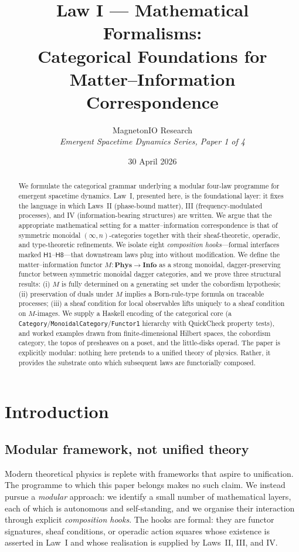 \documentclass[12pt]{article}
\title{Law I --- Mathematical Formalisms:\\
Categorical Foundations for Matter--Information Correspondence}
\author{MagnetonIO Research \\
\textit{Emergent Spacetime Dynamics Series, Paper 1 of 4}}
\date{30 April 2026}
\theoremstyle{definition}
\theoremstyle{remark}
\newcommand{\Phys}{\mathbf{Phys}}
\newcommand{\Info}{\mathbf{Info}}
\begin{document}
\maketitle

\begin{abstract}
We formulate the categorical grammar underlying a modular four-law programme for emergent spacetime dynamics. Law~I, presented here, is the foundational layer: it fixes the language in which Laws~II (phase-bound matter), III (frequency-modulated processes), and IV (information-bearing structures) are written. We argue that the appropriate mathematical setting for a matter--information correspondence is that of symmetric monoidal $(\infty,n)$-categories together with their sheaf-theoretic, operadic, and type-theoretic refinements. We isolate eight \emph{composition hooks}---formal interfaces marked $\mathsf{H1}$--$\mathsf{H8}$---that downstream laws plug into without modification. We define the matter--information functor $M : \Phys \to \Info$ as a strong monoidal, dagger-preserving functor between symmetric monoidal dagger categories, and we prove three structural results: (i) $M$ is fully determined on a generating set under the cobordism hypothesis; (ii) preservation of duals under $M$ implies a Born-rule-type formula on traceable processes; (iii) a sheaf condition for local observables lifts uniquely to a sheaf condition on $M$-images. We supply a Haskell encoding of the categorical core (a \texttt{Category}/\texttt{MonoidalCategory}/\texttt{Functor1} hierarchy with QuickCheck property tests), and worked examples drawn from finite-dimensional Hilbert spaces, the cobordism category, the topos of presheaves on a poset, and the little-disks operad. The paper is explicitly modular: nothing here pretends to a unified theory of physics. Rather, it provides the substrate onto which subsequent laws are functorially composed.
\end{abstract}

\tableofcontents

\section{Introduction}
\label{sec:introduction}

\subsection{Modular framework, not unified theory}

Modern theoretical physics is replete with frameworks that aspire to unification. The programme to which this paper belongs makes no such claim. We instead pursue a \emph{modular} approach: we identify a small number of mathematical layers, each of which is autonomous and self-standing, and we organise their interaction through explicit \emph{composition hooks}. The hooks are formal: they are functor signatures, sheaf conditions, or operadic action squares whose existence is asserted in Law~I and whose realisation is supplied by Laws~II, III, and IV.
\end{document}
